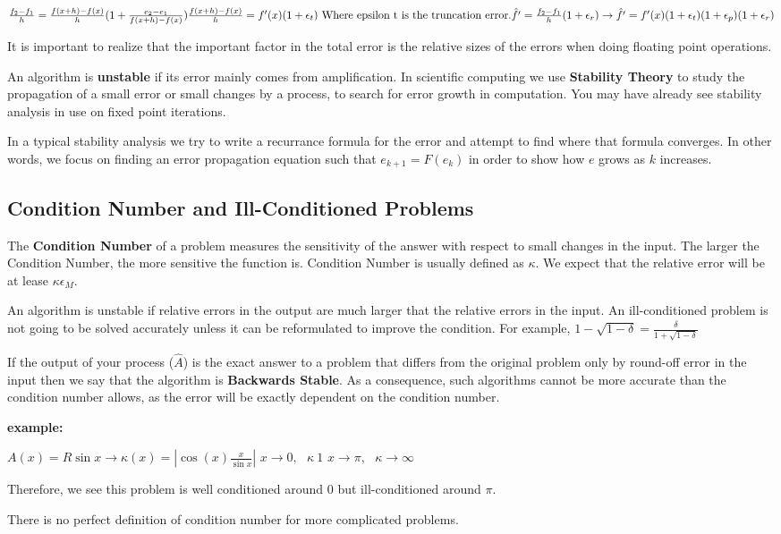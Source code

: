 \documentclass{article}
\newcommand{\n}{\newline}
\begin{document}
\begin{flushleft}
	\begin{math}
		\frac{f_{2}-f_{1}}{h}=\frac{f(x+h)-f(x)}{h}(1+\frac{e_{2}-e_{1}}{f(x+h)-f(x)})
		\frac{f(x+h)-f(x)}{h}=f'(x)(1+\epsilon_{t})
		\text{ Where epsilon t is the truncation error.}\n 
		\hat{f'}=\frac{f_{2}-f_{1}}{h}(1+\epsilon_{r})
		\rightarrow \hat{f'}=f'(x)(1+\epsilon_{t})(1+\epsilon_{p})(1+\epsilon_{r}) \n
	\end{math}
	
	It is important to realize that the important factor in the total error is the relative sizes of the errors when doing floating point operations.\n
	
	An algorithm is \textbf{unstable} if its error mainly comes from amplification.  In scientific computing we use \textbf{Stability Theory} to study the propagation of a small error or small changes by a process, to search for error growth in computation.  You may have already see stability analysis in use on fixed point iterations. \n
	
	In a typical stability analysis we try to write a recurrance formula for the error and attempt to find where that formula converges.  In other words, we focus on finding an error propagation equation such that $e_{k+1}=F(e_{k})$ in order to show how $e$ grows as $k$ increases.
	
	\subsection{Condition Number and Ill-Conditioned Problems}
	
	The \textbf{Condition Number} of a problem measures the sensitivity of the answer with respect to small changes in the input.  The larger the Condition Number, the more sensitive the function is.  Condition Number is usually defined as $\kappa$.  We expect that the relative error will be at lease $\kappa\epsilon_{M}$.  \n
	
	An algorithm is unstable if relative errors in the output are much larger that the relative errors in the input.  An ill-conditioned problem is not going to be solved accurately unless it can be reformulated to improve the condition.  For example, $1-\sqrt{1-\delta}=\frac{\delta}{1+\sqrt{1-\delta}}$ \n
	
	If the output of your process ($\hat{A}$) is the exact answer to a problem that differs from the original problem only by round-off error in the input then we say that the algorithm is \textbf{Backwards Stable}.  As a consequence, such algorithms cannot be more accurate than the condition number allows, as the error will be exactly dependent on the condition number.  \n
	
	\textbf{example: \n}
	
	$A(x)=R\sin{x} \rightarrow \kappa(x)=|\cos(x)\frac{x}{\sin{x}}|$\n
	$x\rightarrow0,\text{ }\kappa~1$\n
	$x\rightarrow\pi,\text{ }\kappa\rightarrow\infty$\n
	
	Therefore, we see this problem is well conditioned around 0 but ill-conditioned around $\pi$. \n
	
	There is no perfect definition of condition number for more complicated problems.  
	
	 
	  
	 
	\end{flushleft}
\end{document}
